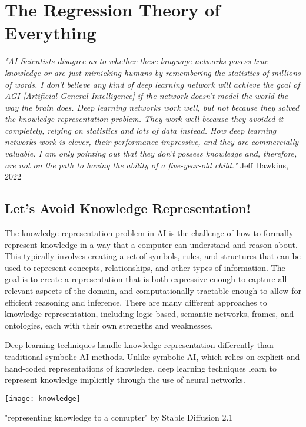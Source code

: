 \setchapterpreamble[u]{\margintoc}
\chapter{The Regression Theory of Everything}

\textit{"AI Scientists disagree as to whether these language networks posess true knowledge or are just mimicking humans by remembering the statistics of millions of words. I don't believe any kind of deep learning network will achieve the goal of AGI [Artificial General Intelligence] if the network doesn't model the world the way the brain does. Deep learning networks work well, but not because they solved the knowledge representation problem. They work well because they avoided it completely, relying on statistics and lots of data instead. How deep learning networks work is clever, their performance impressive, and they are commercially valuable. I am only pointing out that they don't possess knowledge and, therefore, are not on the path to having the ability of a five-year-old child."} Jeff Hawkins, 2022 \cite{hawkins2022}

\section{Let's Avoid Knowledge Representation!}

The knowledge representation problem in AI is the challenge of how to formally represent knowledge in a way that a computer can understand and reason about. This typically involves creating a set of symbols, rules, and structures that can be used to represent concepts, relationships, and other types of information. The goal is to create a representation that is both expressive enough to capture all relevant aspects of the domain, and computationally tractable enough to allow for efficient reasoning and inference. There are many different approaches to knowledge representation, including logic-based, semantic networks, frames, and ontologies, each with their own strengths and weaknesses.

Deep learning techniques handle knowledge representation differently than traditional symbolic AI methods. Unlike symbolic AI, which relies on explicit and hand-coded representations of knowledge, deep learning techniques learn to represent knowledge implicitly through the use of neural networks.


\begin{marginfigure}[-5.5cm]
        \texttt{[image: knowledge]}
        \caption{"representing knowledge to a comupter" by Stable Diffusion 2.1}
\end{marginfigure}


